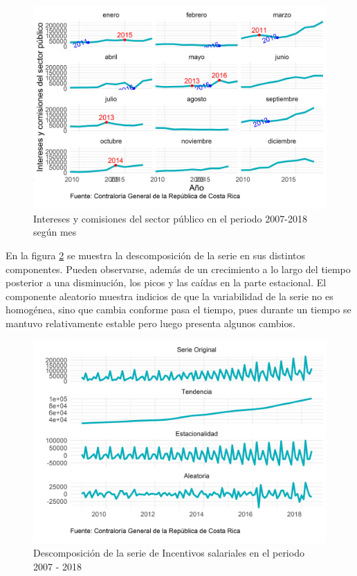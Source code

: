 \documentclass[
]{article}
\begin{document}
\begin{figure}[!h]
\includegraphics[width=1\linewidth,height=1\textheight]{Tesis_files/figure-latex/interesesplotperiodos-1} \caption{Intereses y comisiones del sector público en el periodo 2007-2018 según mes}\label{fig:interesesplotperiodos}
\end{figure}

En la figura \ref{fig:interesesplotdescomposicion} se muestra la
descomposición de la serie en sus distintos componentes. Pueden
observarse, además de un crecimiento a lo largo del tiempo posterior a
una disminución, los picos y las caídas en la parte estacional. El
componente aleatorio muestra indicios de que la variabilidad de la serie
no es homogénea, sino que cambia conforme pasa el tiempo, pues durante
un tiempo se mantuvo relativamente estable pero luego presenta algunos
cambios.

\begin{figure}[!h]
\includegraphics[width=1\linewidth,height=1\textheight]{Tesis_files/figure-latex/interesesplotdescomposicion-1} \caption{Descomposición de la serie de Incentivos salariales en el periodo 2007 - 2018}\label{fig:interesesplotdescomposicion}
\end{figure}
\end{document}
